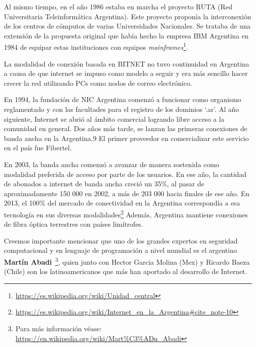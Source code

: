 \documentclass[12pt]{report} %
\begin{document}
Al mismo tiempo, en el año 1986 estaba en marcha el proyecto RUTA (Red Universitaria Teleinformática Argentina). Este proyecto proponía la interconexión de los centros de cómputos de varias Universidades Nacionales. Se trataba de una extensión de la propuesta original que había hecho la empresa IBM Argentina en 1984 de equipar estas instituciones con 
equipos \textit{mainframes}\footnote{ \url{https://es.wikipedia.org/wiki/Unidad_central}}. 

La modalidad de conexión basada en BITNET no tuvo continuidad en Argentina a causa de que internet se impuso como modelo a seguir y era más sencillo hacer crecer la red utilizando PCs como nodos de correo electrónico.

En 1994, la fundación de NIC Argentina comenzó a funcionar como organismo reglamentado y con las facultades para el registro de los dominios ‘.ar’. Al año siguiente, Internet se abrió al ámbito comercial logrando libre acceso a la comunidad en general. Dos años más tarde, se lanzan las primeras conexiones de banda ancha en la Argentina.9 El primer proveedor en comercializar este servicio en el país fue Fibertel.


En 2003, la banda ancha comenzó a avanzar de manera sostenida como modalidad preferida de acceso por parte de los usuarios. En ese año, la cantidad de abonados a internet de banda ancha creció un 35\%, al pasar de aproximadamente 150 000 en 2002, a más de 203 000 hacia finales de ese año. En 2013, el 100\% del mercado de conectividad en la Argentina correspondía a esa tecnología en sus diversas 
modalidades\footnote{\url{https://es.wikipedia.org/wiki/Internet_en_la_Argentina\#cite_note-10}} Además, Argentina mantiene conexiones de fibra óptica terrestres con países limítrofes.






Creemos importante mencionar que uno de los grandes expertos en seguridad computacional y en lenguaje de programación a nivel mundial es el argentino \textbf{Martín Abadi}~\footnote{Para más información véase: \url{https://en.wikipedia.org/wiki/Mart\%C3\%ADn\_Abadi}}, quien
junto con Hector Garcia Molina (Mex) y Ricardo Baeza (Chile) son los latinoamericanos que más han aportado al desarrollo de Internet.
\end{document}
